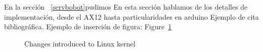 En la secci\'on ~\ref{servbobot}pudimos
En esta sección hablamos de los detalles de implementación, desde el AX12 hasta particularidades en arduino
Ejemplo de cita bibliogr\'afica\cite{Trivedi00modelingand}.
Ejemplo de inserci\'on de figura: 
Figure~\ref{fig:kernelchanges}

\begin{figure}[phtb]
\begin{center}
\caption{Changes introduced to Linux kernel}
\label{fig:kernelchanges}
\end{center}
\end{figure}

